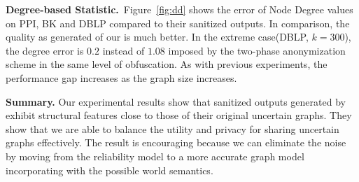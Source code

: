 \textbf{Degree-based Statistic.}~Figure~\ref{fig:dd} shows the error of Node Degree values on PPI, BK and DBLP compared to their sanitized outputs.  
In comparison, the quality as generated of our {\methodName} is much better.  
In the extreme case(DBLP, $k=300$), the degree error is $0.2$ instead of $1.08$ imposed by the two-phase anonymization scheme in the same level of obfuscation.  
As with previous experiments, the performance gap increases as the graph size increases.

\textbf{Summary.} 
Our experimental results show that sanitized outputs generated by {\methodName} exhibit structural features close to those of their original uncertain graphs. 
They show that we are able to balance the utility and privacy for sharing uncertain graphs effectively. 
The result is encouraging because we can eliminate the noise by moving from the reliability model to a more accurate graph model incorporating with the possible world semantics.